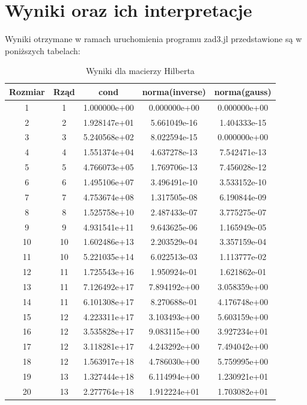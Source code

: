 \documentclass[a4paper,14pt]{report}
\begin{document}
  \section{Wyniki oraz ich interpretacje}
    Wyniki otrzymane w ramach uruchomienia programu zad3.jl przedstawione są w poniższych tabelach: 
    \begin{table}[H]
    \centering
    \begin{tabular}{|c | c | c | c | c |} 
     \hline
     Rozmiar & Rząd & cond & norma(inverse) & norma(gauss) \\ [0.5ex] 
     \hline\hline
     1 & 1 & 1.000000e+00 & 0.000000e+00 & 0.000000e+00 \\
     2 & 2 & 1.928147e+01 & 5.661049e-16 & 1.404333e-15 \\
     3 & 3 & 5.240568e+02 & 8.022594e-15 & 0.000000e+00 \\
     4 & 4 & 1.551374e+04 & 4.637278e-13 & 7.542471e-13 \\
     5 & 5 & 4.766073e+05 & 1.769706e-13 & 7.456028e-12 \\
     6 & 6 & 1.495106e+07 & 3.496491e-10 & 3.533152e-10 \\
     7 & 7 & 4.753674e+08 & 1.317505e-08 & 6.190844e-09 \\
     8 & 8 & 1.525758e+10 & 2.487433e-07 & 3.775275e-07 \\
     9 & 9 & 4.931541e+11 & 9.643625e-06 & 1.165949e-05 \\
     10 & 10 & 1.602486e+13 & 2.203529e-04 & 3.357159e-04 \\
     11 & 10 & 5.221035e+14 & 6.022513e-03 & 1.113777e-02 \\
     12 & 11 & 1.725543e+16 & 1.950924e-01 & 1.621862e-01 \\
     13 & 11 & 7.126492e+17 & 7.894192e+00 & 3.058359e+00 \\
     14 & 11 & 6.101308e+17 & 8.270688e-01 & 4.176748e+00 \\
     15 & 12 & 4.223311e+17 & 3.103493e+00 & 5.603159e+00 \\
     16 & 12 & 3.535828e+17 & 9.083115e+00 & 3.927234e+01 \\
     17 & 12 & 3.118281e+17 & 4.243292e+00 & 7.494042e+00 \\
     18 & 12 & 1.563917e+18 & 4.786030e+00 & 5.759995e+00 \\
     19 & 13 & 1.327444e+18 & 6.114994e+00 & 1.230921e+01 \\
     20 & 13 & 2.277764e+18 & 1.912224e+01 & 1.703082e+01 \\
     \hline
    \end{tabular}
    \caption{Wyniki dla macierzy Hilberta}
    \label{Zad3Hilbert}
    \end{table}
\end{document}

